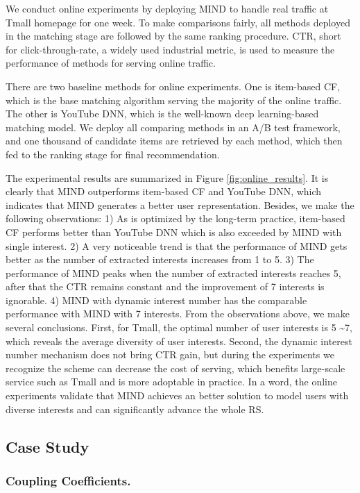 \documentclass[sigconf]{acmart}
\begin{document}
We conduct online experiments by deploying MIND to handle real traffic at Tmall homepage for one week.
To make comparisons fairly, all methods deployed in the matching stage are followed by the same ranking procedure.
CTR, short for click-through-rate, a widely used industrial metric, is used to measure the performance of methods for serving online traffic.

There are two baseline methods for online experiments.
One is item-based CF, which is the base matching algorithm serving the majority of the online traffic.
The other is YouTube DNN, which is the well-known deep learning-based matching model.
We deploy all comparing methods in an A/B test framework, and one thousand of candidate items are retrieved by each method, which then fed to the ranking stage for final recommendation.

The experimental results are summarized in Figure \ref{fig:online_results}.
It is clearly that MIND outperforms item-based CF and YouTube DNN, which indicates that MIND generates a better user representation.
Besides, we make the following observations:
1) As is optimized by the long-term practice, item-based CF performs better than YouTube DNN which is also exceeded by MIND with single interest.
2) A very noticeable trend is that the performance of MIND gets better as the number of extracted interests increases from 1 to 5.
3) The performance of MIND peaks when the number of extracted interests reaches 5, after that the CTR remains constant and the improvement of 7 interests is ignorable.
4) MIND with dynamic interest number has the comparable performance with MIND with 7 interests.
From the observations above, we make several conclusions.
First, for Tmall, the optimal number of user interests is 5 \textasciitilde 7, which reveals the average diversity of user interests.
Second, the dynamic interest number mechanism does not bring CTR gain, but during the experiments we recognize the scheme can decrease the cost of serving, which benefits large-scale service such as Tmall and is more adoptable in practice.
In a word, the online experiments validate that MIND achieves an better solution to model users with diverse interests and can significantly advance the whole RS.


\subsection{Case Study}

\subsubsection{Coupling Coefficients.}
\end{document}
